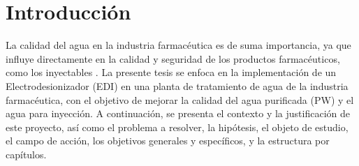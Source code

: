 \chapter*{Introducción}
La calidad del agua en la industria farmacéutica es de suma importancia,
ya que influye directamente en la calidad y seguridad de los productos
farmacéuticos, como los inyectables \cite{juanantoniodelacuerdaImportanciaAguaIndustria2021}. La presente tesis se enfoca en la
implementación de un Electrodesionizador (EDI) en una planta
de tratamiento de agua de la industria farmacéutica, con el objetivo de
mejorar la calidad del agua purificada (PW) y el agua para inyección.
A continuación, se presenta el contexto y la justificación de este
proyecto, así como el problema a resolver, la hipótesis, el objeto
de estudio, el campo de acción, los objetivos generales y específicos,
y la estructura por capítulos.











